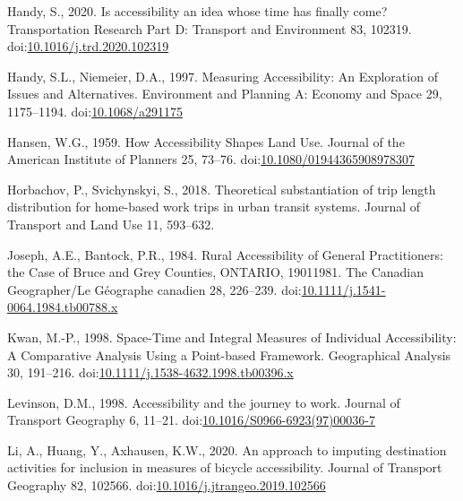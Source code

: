 \documentclass[]{elsarticle} %
\newlength{\cslhangindent}
\newlength{\cslentryspacingunit} %
\newenvironment{CSLReferences}[2] %
 {%
  \setlength{\parindent}{0pt}
  \ifodd #1
  \let\oldpar\par
  \def\par{\hangindent=\cslhangindent\oldpar}
  \fi
  \setlength{\parskip}{#2\cslentryspacingunit}
 }%
 {}
\begin{document}
\begin{CSLReferences}{1}{0}
\leavevmode{}%
Handy, S., 2020. Is accessibility an idea whose time has finally come?
Transportation Research Part D: Transport and Environment 83, 102319.
doi:\href{https://doi.org/10.1016/j.trd.2020.102319}{10.1016/j.trd.2020.102319}

\leavevmode{}%
Handy, S.L., Niemeier, D.A., 1997. Measuring {Accessibility}: {An}
{Exploration} of {Issues} and {Alternatives}. Environment and Planning
A: Economy and Space 29, 1175--1194.
doi:\href{https://doi.org/10.1068/a291175}{10.1068/a291175}

\leavevmode{}%
Hansen, W.G., 1959. How Accessibility Shapes Land Use. Journal of the
American Institute of Planners 25, 73--76.
doi:\href{https://doi.org/10.1080/01944365908978307}{10.1080/01944365908978307}

\leavevmode{}%
Horbachov, P., Svichynskyi, S., 2018. Theoretical substantiation of trip
length distribution for home-based work trips in urban transit systems.
Journal of Transport and Land Use 11, 593--632.

\leavevmode{}%
Joseph, A.E., Bantock, P.R., 1984. Rural Accessibility of General
Practitioners: the Case of Bruce and Grey Counties, ONTARIO,
1901{\textendash}1981. The Canadian Geographer/Le Géographe canadien 28,
226--239.
doi:\href{https://doi.org/10.1111/j.1541-0064.1984.tb00788.x}{10.1111/j.1541-0064.1984.tb00788.x}

\leavevmode{}%
Kwan, M.-P., 1998. Space-{Time} and {Integral} {Measures} of
{Individual} {Accessibility}: {A} {Comparative} {Analysis} {Using} a
{Point}-based {Framework}. Geographical Analysis 30, 191--216.
doi:\href{https://doi.org/10.1111/j.1538-4632.1998.tb00396.x}{10.1111/j.1538-4632.1998.tb00396.x}

\leavevmode{}%
Levinson, D.M., 1998. Accessibility and the journey to work. Journal of
Transport Geography 6, 11--21.
doi:\href{https://doi.org/10.1016/S0966-6923(97)00036-7}{10.1016/S0966-6923(97)00036-7}

\leavevmode{}%
Li, A., Huang, Y., Axhausen, K.W., 2020. An approach to imputing
destination activities for inclusion in measures of bicycle
accessibility. Journal of Transport Geography 82, 102566.
doi:\href{https://doi.org/10.1016/j.jtrangeo.2019.102566}{10.1016/j.jtrangeo.2019.102566}


\end{CSLReferences}
\end{document}
